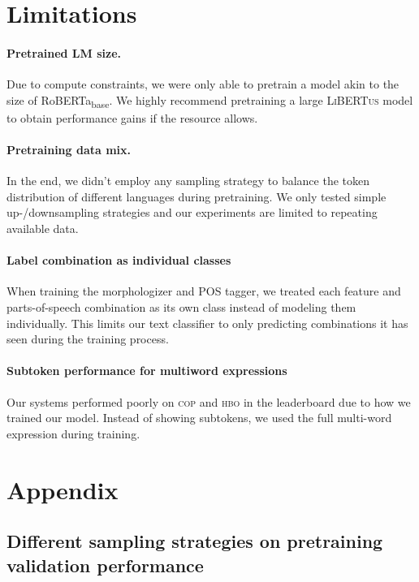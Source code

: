 \documentclass[11pt]{article}
\newcommand{\libertus}{\textsc{LiBERTus}}
\begin{document}
\section*{Limitations}

\paragraph{Pretrained LM size.}
Due to compute constraints, we were only able to pretrain a model akin to the size of RoBERTa\textsubscript{base}.
We highly recommend pretraining a large \libertus{} model to obtain performance gains if the resource allows.

\paragraph{Pretraining data mix.}
In the end, we didn't employ any sampling strategy to balance the token distribution of different languages during pretraining.
We only tested simple up-/downsampling strategies and our experiments are limited to repeating available data.

\paragraph{Label combination as individual classes}
When training the morphologizer and POS tagger, we treated each feature and parts-of-speech combination as its own class instead of modeling them individually.
This limits our text classifier to only predicting combinations it has seen during the training process.

\paragraph{Subtoken performance for multiword expressions}
Our systems performed poorly on \textsc{cop} and \textsc{hbo} in the leaderboard due to how we trained our model.
Instead of showing subtokens, we used the full multi-word expression during training.



\appendix

\section{Appendix}
\label{sec:appendix}

\subsection{Different sampling strategies on pretraining validation performance}
\label{sec:appendix_sampling}
\end{document}
